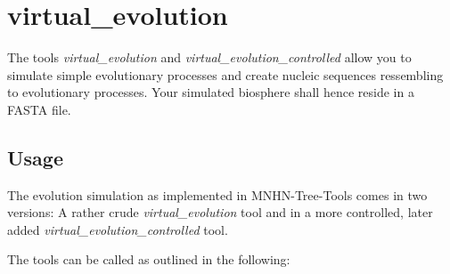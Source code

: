 \section{virtual\_evolution} \label{sec-virtual-ev}

The tools \emph{virtual\_evolution} and
\emph{virtual\_evolution\_controlled} allow you to simulate simple
evolutionary processes and create nucleic sequences ressembling to
evolutionary processes. Your simulated biosphere shall hence
reside in a FASTA file.

\subsection{Usage}

The evolution simulation as implemented
in MNHN-Tree-Tools comes in two versions: A rather crude
\emph{virtual\_evolution} tool and in a more controlled, later
added \emph{virtual\_evolution\_controlled} tool.

The tools can be called as outlined in the following:

